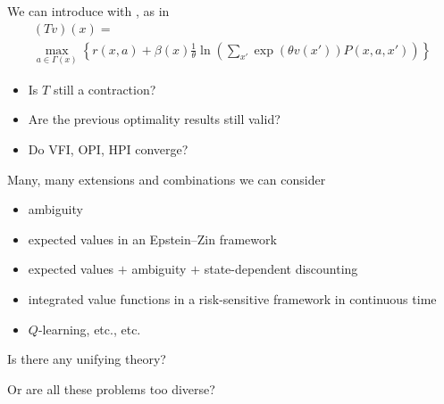\documentclass[dvipsnames]{beamer}
\begin{document}
\begin{frame}
    
    We can introduce  with , as in
    \begin{multline*}
        (Tv)(x) = \\
        \max_{a \in \Gamma(x)}
            \left\{
                r(x, a) + \beta(x) \frac{1}{\theta} \ln 
                \left(
                    \sum_{x'} \exp(\theta v(x')) P(x, a, x')
                \right)
            \right\}
    \end{multline*}

            \vspace{0.5em}
            \vspace{0.5em}
            \vspace{0.5em}

    \begin{itemize}
        \item Is $T$ still a contraction?
            \vspace{0.5em}
        \item Are the previous optimality results still valid?
            \vspace{0.5em}
        \item Do VFI, OPI, HPI converge?
    \end{itemize}

\end{frame}


\begin{frame}
    
    Many, many extensions and combinations we can consider
    \begin{itemize}
        \item ambiguity
            \vspace{0.5em}
        \item expected values in an Epstein--Zin framework
            \vspace{0.5em}
        \item expected values $+$ ambiguity $+$ state-dependent discounting
            \vspace{0.5em}
        \item integrated value functions in a risk-sensitive framework in
            continuous time
            \vspace{0.5em}
        \item $Q$-learning, etc., etc.
    \end{itemize}

            \vspace{0.5em}
            \vspace{0.5em}
            \vspace{0.5em}
    Is there any unifying theory?

            \vspace{0.5em}
    Or are all these problems too diverse?

\end{frame}
\end{document}
